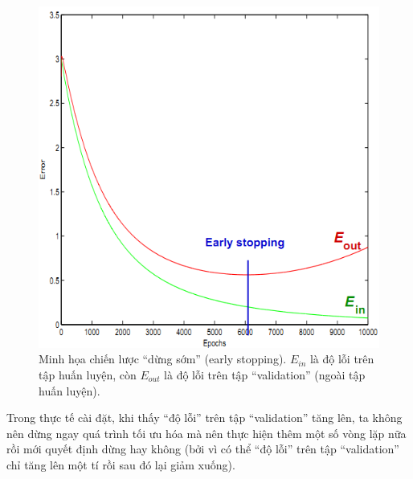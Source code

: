 \begin{figure}
	\centering
	\includegraphics[scale=0.9]{EarlyStopping}
	\caption[Minh họa chiến lược ``dừng sớm'']{Minh họa chiến lược ``dừng sớm'' (early stopping). $E_{in}$ là độ lỗi trên tập huấn luyện, còn $E_{out}$ là độ lỗi trên tập ``validation'' (ngoài tập huấn luyện).}
	\label{fig_EarlyStopping}
\end{figure}

Trong thực tế cài đặt, khi thấy ``độ lỗi'' trên tập ``validation'' tăng lên, ta không nên dừng ngay quá trình tối ưu hóa mà nên thực hiện thêm một số vòng lặp nữa rồi mới quyết định dừng hay không (bởi vì có thể ``độ lỗi'' trên tập ``validation'' chỉ tăng lên một tí rồi sau đó lại giảm xuống). 


